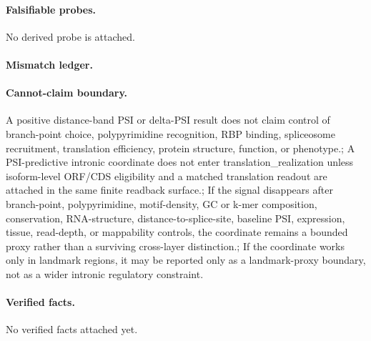 \paragraph{Falsifiable probes.}
No derived probe is attached.

\paragraph{Mismatch ledger.}
\paragraph{Cannot-claim boundary.} A positive distance-band PSI or delta-PSI result does not claim control of branch-point choice, polypyrimidine recognition, RBP binding, spliceosome recruitment, translation efficiency, protein structure, function, or phenotype.; A PSI-predictive intronic coordinate does not enter translation\_realization unless isoform-level ORF/CDS eligibility and a matched translation readout are attached in the same finite readback surface.; If the signal disappears after branch-point, polypyrimidine, motif-density, GC or k-mer composition, conservation, RNA-structure, distance-to-splice-site, baseline PSI, expression, tissue, read-depth, or mappability controls, the coordinate remains a bounded proxy rather than a surviving cross-layer distinction.; If the coordinate works only in landmark regions, it may be reported only as a landmark-proxy boundary, not as a wider intronic regulatory constraint.

\paragraph{Verified facts.}
No verified facts attached yet.

